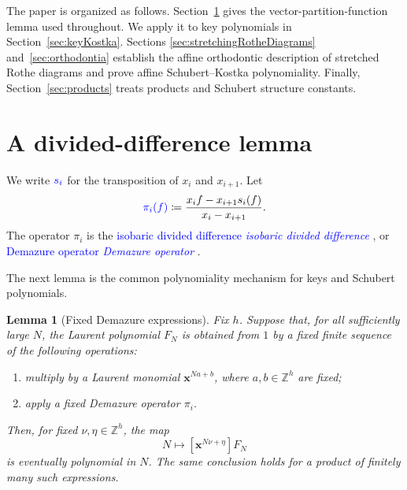 \documentclass[11pt,reqno]{amsart}
\newtheorem{lemma}[theorem]{Lemma}
\theoremstyle{definition}
\newcommand{\setZ}{\mathbb{Z}}
\newcommand{\xvec}{\mathbf{x}}
\newcommand{\defin}[1]{%
  \relax\ifmmode%
  \textcolor{blue}{#1}%
  \else\textcolor{blue}{\emph{#1}}%
  \fi%
}
\begin{document}
The paper is organized as follows.  Section~\ref{sec:dividedDifferenceLemma}
gives the vector-partition-function lemma used throughout.  We apply it to key
polynomials in Section~\ref{sec:keyKostka}.  Sections
\ref{sec:stretchingRotheDiagrams} and~\ref{sec:orthodontia} establish the
affine orthodontic description of stretched Rothe diagrams and prove affine
Schubert--Kostka polynomiality.  Finally, Section~\ref{sec:products} treats
products and Schubert structure constants.

\section{A divided-difference lemma}
\label{sec:dividedDifferenceLemma}

We write
\(\defin{s_i}\) for the transposition of \(x_i\) and \(x_{i+1}\).  Let
\[
\defin{\pi_i(f)}
\coloneqq
\frac{x_i f-x_{i+1}s_i(f)}{x_i-x_{i+1}}.
\]
The operator \(\pi_i\) is the \defin{isobaric divided difference}, or
\defin{Demazure operator}.

The next lemma is the common polynomiality mechanism for keys and Schubert
polynomials.

\begin{lemma}[Fixed Demazure expressions]
\label{lem:fixedDemazureExpressions}
Fix \(h\).  Suppose that, for all sufficiently large \(N\), the Laurent
polynomial \(F_N\) is obtained from \(1\) by a fixed finite sequence of the
following operations:
\begin{enumerate}
\item multiply by a Laurent monomial
  \(\xvec^{Na+b}\), where \(a,b\in\setZ^h\) are fixed;
\item apply a fixed Demazure operator \(\pi_i\).
\end{enumerate}
Then, for fixed \(\nu,\eta\in\setZ^h\), the map
\[
N\longmapsto
[\xvec^{N\nu+\eta}]F_N
\]
is eventually polynomial in \(N\).  The same conclusion holds for a product
of finitely many such expressions.
\end{lemma}
\end{document}
